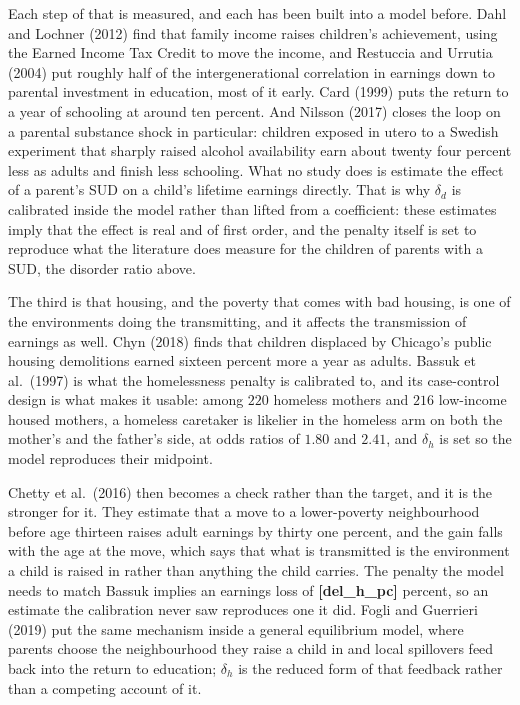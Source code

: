 \documentclass[10pt]{article}
\begin{document}
Each step of that is measured, and each has been built into a
model before. Dahl and Lochner (2012) find that family income raises
children's achievement, using the Earned Income Tax Credit to move the income, and
Restuccia and Urrutia (2004) put roughly half of the intergenerational correlation
in earnings down to parental investment in education, most of it early. Card (1999)
puts the return to a year of schooling at around ten percent. And Nilsson
(2017) closes the loop on a parental substance shock in
particular: children exposed in utero to a Swedish experiment that sharply raised
alcohol availability earn about twenty four percent less as adults and finish less
schooling. What no study does
is estimate the effect of a parent's SUD on a child's lifetime earnings directly. That
is why $\delta_d$ is calibrated inside the model rather than lifted from a
coefficient: these estimates imply that the effect is real and of first order, and the
penalty itself is set to reproduce what the literature does measure for the children
of parents with a SUD, the disorder ratio above.

The third is that housing, and the poverty that comes with bad housing,
is one of the environments doing the transmitting, and it affects the
transmission of earnings as well. Chyn (2018) finds that children
displaced by Chicago's public housing demolitions earned sixteen percent more a year
as adults. Bassuk et al.\ (1997) is what the homelessness penalty is calibrated
to, and its case-control design is what makes it usable: among $220$ homeless mothers
and $216$ low-income housed mothers,  a homeless caretaker is likelier in the homeless arm on both the mother's and the father's side, at odds ratios of $1.80$ and $2.41$, and $\delta_h$ is set so the model reproduces their
midpoint.

Chetty et al.\ (2016) then becomes a check rather than the target, and it is the
stronger for it. They estimate that a move to a lower-poverty neighbourhood before age thirteen raises
adult earnings by thirty one percent, and the gain falls with the age at the move,
which says that what is transmitted is the environment a child is raised in rather than
anything the child carries. The penalty the model needs to match Bassuk implies an
earnings loss of \textbf{[del_h_pc]} percent, so an estimate the calibration never saw
reproduces one it did. Fogli and Guerrieri (2019) put the same mechanism inside a
general equilibrium model, where parents choose the neighbourhood they raise a child in
and local spillovers feed back into the return to education; $\delta_h$ is the reduced
form of that feedback rather than a competing account of it.
\end{document}
